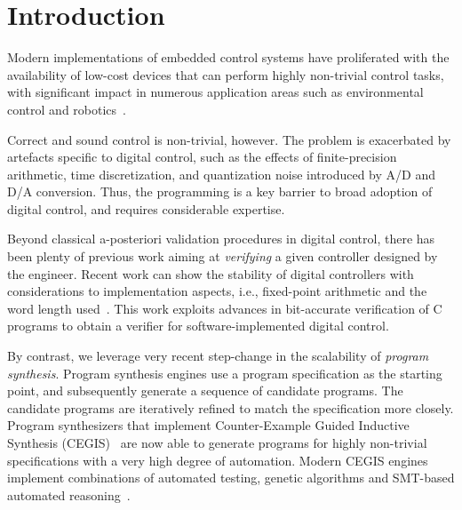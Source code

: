 \documentclass{sig-alternate-05-2015}
\begin{document}
%
%
\printccsdesc



\section{Introduction}

Modern implementations of embedded control systems have proliferated with the
availability of low-cost devices that can perform highly non-trivial control
tasks, with significant impact in numerous application areas such as
environmental control and robotics~\cite{astrom1997computer, Franklin15}.

Correct and sound control is non-trivial, however. The problem is exacerbated by
artefacts specific to digital control, such as the effects of
finite-precision arithmetic, time discretization, and quantization noise
introduced by A/D and D/A conversion.  Thus, the programming is a key
barrier to broad adoption of digital control, and requires considerable
expertise.

Beyond classical a-posteriori validation procedures in digital control, 
there has been plenty of previous work aiming at \emph{verifying} a given
controller designed by the engineer.  Recent work can show the stability of 
digital controllers with considerations to implementation aspects, i.e.,
fixed-point arithmetic and the word length used~\cite{Bessa16}.  This work
exploits advances in bit-accurate verification of C programs to obtain a
verifier for software-implemented digital control.

By contrast, we leverage very recent step-change in the scalability of
\emph{program synthesis}.  Program synthesis engines use a program
specification as the starting point, and subsequently generate a sequence of
candidate programs.  The candidate programs are iteratively refined to match
the specification more closely.  Program synthesizers that implement
Counter-Example Guided Inductive Synthesis (CEGIS)~\cite{sketch} are now
able to generate programs for highly non-trivial specifications with a very
high degree of automation.  Modern CEGIS engines implement combinations of
automated testing, genetic algorithms and SMT-based automated
reasoning~\cite{DBLP:conf/lpar/DavidKL15, DBLP:conf/cav/0001A14}.
\end{document}

